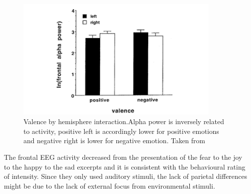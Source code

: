 \begin{figure}[h!]
\includegraphics[width=10cm]{img/related_work/valence_hemisphere_alpha.png}
\centering
\caption{Valence by hemisphere interaction.Alpha power is inversely related to activity, positive left is accordingly lower for positive emotions and negative right is lower for negative emotion. Taken from \cite{schmidt_frontal_2001}}\label{fig_schmidt_valence_alpha}
\end{figure}
The frontal \ac{EEG} activity decreased from the presentation of the fear to the joy to the happy to the sad excerpts and it is consistent with the behavioural rating of intensity. Since they only used auditory stimuli, the lack of parietal differences might be due to the lack of external focus from environmental stimuli. 

